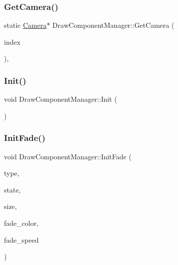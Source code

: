 \mbox{\label{class_draw_component_manager_add448787d457fb884d0079cb2b9da0a5}} 
\subsubsection{\texorpdfstring{Get\+Camera()}{GetCamera()}}
{\footnotesize\ttfamily static \mbox{\hyperlink{class_camera}{Camera}}$\ast$ Draw\+Component\+Manager\+::\+Get\+Camera (\begin{DoxyParamCaption}\item[{unsigned}]{index }\end{DoxyParamCaption})\hspace{0.3cm}{\ttfamily [inline]}, {\ttfamily [static]}}

\mbox{\label{class_draw_component_manager_a73e0f46e49bf2f5dcbe96b5227ec99de}} 
\subsubsection{\texorpdfstring{Init()}{Init()}}
{\footnotesize\ttfamily void Draw\+Component\+Manager\+::\+Init (\begin{DoxyParamCaption}{ }\end{DoxyParamCaption})\hspace{0.3cm}{\ttfamily [static]}}

\mbox{\label{class_draw_component_manager_ae4d6aae179ab380e40f2608dc89ac991}} 
\subsubsection{\texorpdfstring{Init\+Fade()}{InitFade()}}
{\footnotesize\ttfamily void Draw\+Component\+Manager\+::\+Init\+Fade (\begin{DoxyParamCaption}\item[{\mbox{\hyperlink{class_fade_ac06f27215b454aa05b93c236476d6e80}{Fade\+::\+Type}}}]{type,  }\item[{\mbox{\hyperlink{class_fade_ae77826bf3ff2ab95fb7b3b6f95cba80a}{Fade\+::\+State}}}]{state,  }\item[{\mbox{\hyperlink{_vector3_d_8h_a5ef6e95dfc5f9d3820b71772d99bbc25}{Vec2}}}]{size,  }\item[{\mbox{\hyperlink{_vector3_d_8h_a680c30c4a07d86fe763c7e01169cd6cc}{X\+Color4}}}]{fade\+\_\+color,  }\item[{float}]{fade\+\_\+speed }\end{DoxyParamCaption})\hspace{0.3cm}{\ttfamily [static]}}

